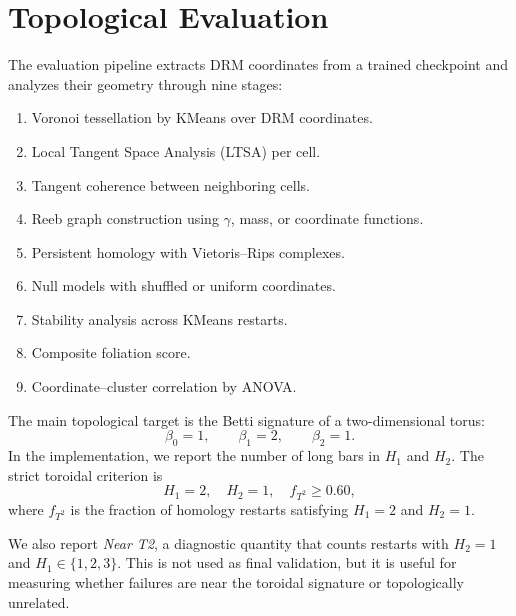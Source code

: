 \section{Topological Evaluation}
\label{sec:topological_evaluation}

The evaluation pipeline extracts DRM coordinates from a trained checkpoint and
analyzes their geometry through nine stages:
\begin{enumerate}
  \item Voronoi tessellation by KMeans over DRM coordinates.
  \item Local Tangent Space Analysis (LTSA) per cell.
  \item Tangent coherence between neighboring cells.
  \item Reeb graph construction using $\gamma$, mass, or coordinate functions.
  \item Persistent homology with Vietoris--Rips complexes.
  \item Null models with shuffled or uniform coordinates.
  \item Stability analysis across KMeans restarts.
  \item Composite foliation score.
  \item Coordinate--cluster correlation by ANOVA.
\end{enumerate}

The main topological target is the Betti signature of a two-dimensional torus:
\begin{equation}
  \beta_0=1,\qquad \beta_1=2,\qquad \beta_2=1.
\end{equation}
In the implementation, we report the number of long bars in $H_1$ and $H_2$.
The strict toroidal criterion is
\begin{equation}
  H_1=2,\quad H_2=1,\quad f_{T^2}\geq 0.60,
\end{equation}
where $f_{T^2}$ is the fraction of homology restarts satisfying $H_1=2$ and
$H_2=1$.

We also report \emph{Near T2}, a diagnostic quantity that counts restarts with
$H_2=1$ and $H_1\in\{1,2,3\}$. This is not used as final validation, but it is
useful for measuring whether failures are near the toroidal signature or
topologically unrelated.
